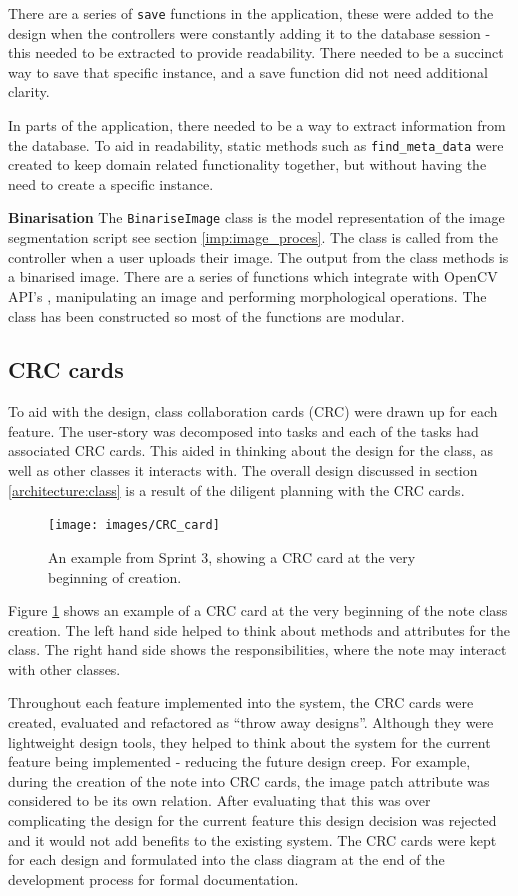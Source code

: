 There are a series of \texttt{save} functions in the application, these were added to the design when the controllers were constantly adding it to the database session - this needed to be extracted to provide readability. There needed to be a succinct way to save that specific instance, and a save function did not need additional clarity.

In parts of the application, there needed to be a way to extract information from the database. To aid in readability, static methods such as \texttt{find\_meta\_data} were created to keep domain related functionality together, but without having the need to create a specific instance.

\noindent
\textbf{Binarisation}
\newline
The \texttt{BinariseImage} class is the model representation of the image segmentation script see section \ref{imp:image_proces}. The class is called from the controller when a user uploads their image. The output from the class methods is a binarised image. There are a series of functions which integrate with OpenCV API's \cite{citeulike:13206865}, manipulating an image and performing morphological operations. The class has been constructed so most of the functions are modular.

\subsection{CRC cards}
To aid with the design, class collaboration cards (CRC) were drawn up for each feature. The user-story was decomposed into tasks and each of the tasks had associated CRC cards. This aided in thinking about the design for the class, as well as other classes it interacts with.  The overall design discussed in section \ref{architecture:class} is a result of the diligent planning with the CRC cards.

\begin{figure}[H]
  \centering
  \texttt{[image: images/CRC\_card]}
  \caption{An example from Sprint 3, showing a CRC card at the very beginning of creation.}
  \label{fig:crc1}
\end{figure}

Figure \ref{fig:crc1} shows an example of a CRC card at the very beginning of the note class creation. The left hand side helped to think about methods and attributes for the class. The right hand side shows the responsibilities, where the note may interact with other classes.

Throughout each feature implemented into the system, the CRC cards were created, evaluated and refactored as ``throw away designs''. Although they were lightweight design tools, they helped to think about the system for the current feature being implemented - reducing the future design creep. For example, during the creation of the note into CRC cards, the image patch attribute was considered to be its own relation. After evaluating that this was over complicating the design for the current feature this design decision was rejected and it would not add benefits to the existing system. The CRC cards were kept for each design and formulated into the class diagram at the end of the development process for formal documentation.

